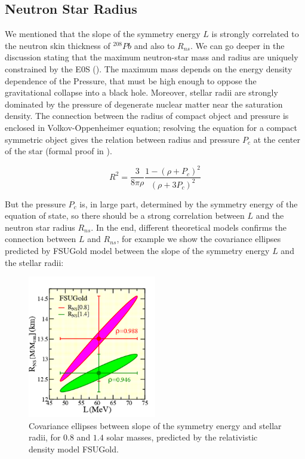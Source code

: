 \subsection{Neutron Star Radius}

We mentioned that the slope of the symmetry energy $L$ is strongly correlated to the neutron skin thickness of $^{208}Pb$ and also to $R_{ns}$. We can go deeper in the discussion stating that the maximum neutron-star mass and radius are uniquely constrained by the E0S (\cite{Lindblom1992DeterminingTN}). The maximum mass depends on the energy density dependence of the Pressure, that must be high enough to oppose the gravitational collapse into a black hole. Moreover, stellar radii are strongly dominated by the pressure of degenerate nuclear matter near the saturation density.  
The connection between the radius of compact object and pressure is enclosed in Volkov-Oppenheimer equation; resolving the equation 
for a compact symmetric object gives the relation between radius and pressure $P_{c}$ at the center of the star (formal proof in \cite{LATTIMER_2007}).

\begin{equation}
R^{2} = \dfrac{3}{8\pi \rho} \dfrac{1 - (\rho + P_{c})^{2}}{(\rho + 3 P_{c})^{2}}
\end{equation}

But the pressure $P_{c}$ is, in large part, determined by the symmetry energy of the equation of state, so there should be a strong correlation between $L$ and the neutron star radius $R_{ns}$. In the end, different theoretical models \cite{PhysRevLett.95.122501} confirms the connection between $L$ and $R_{ns}$, for example we show the covariance ellipses predicted by FSUGold model between the slope of the symmetry energy $L$ and the stellar radii:

\begin{figure}[hbtp]
\centering
\includegraphics[width = 0.5\textwidth]{Introduzione/LvsRns.pdf}
\caption{Covariance ellipses between slope of the symmetry energy and stellar radii, for $0.8$ and $1.4$ solar masses, predicted by the relativistic density model FSUGold.}
\end{figure}

